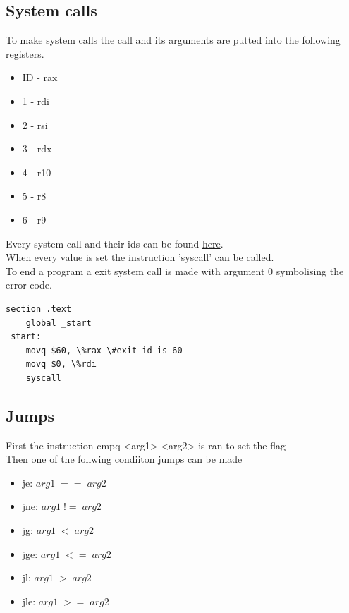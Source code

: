 \documentclass[12pt, a4paper]{article}
\begin{document}
		\subsection{System calls}
			To make system calls the call and its arguments are putted into the following registers.\\
			\begin{itemize}
				\item ID - rax
				\item 1 - rdi
				\item 2 - rsi
				\item 3 - rdx
				\item 4 - r10
				\item 5 - r8
				\item 6 - r9
			\end{itemize}
			Every system call and their ids can be found \href{https://filippo.io/linux-syscall-table/}{here}.\\
			When every value is set the instruction 'syscall' can be called.\\[4mm]
			
			To end a program a exit system call is made with argument 0 symbolising the error code.\\
			\begin{lstlisting}[language={[x86masm]Assembler}]
section .text
	global _start
_start:
	movq $60, \%rax \#exit id is 60
	movq $0, \%rdi
	syscall \end{lstlisting}
		\subsection{Jumps}
			First the instruction cmpq <arg1> <arg2> is ran to set the flag\\
			Then one of the follwing condiiton jumps can be made
			\begin{itemize}
				\item je: $arg1\; ==\; arg2$
				\item jne: $arg1\; !=\; arg2$
				\item jg: $arg1\; <\; arg2$
				\item jge: $arg1\; <=\; arg2$
				\item jl: $arg1\; >\; arg2$
				\item jle: $arg1\; >=\; arg2$
			\end{itemize}
\end{document}
